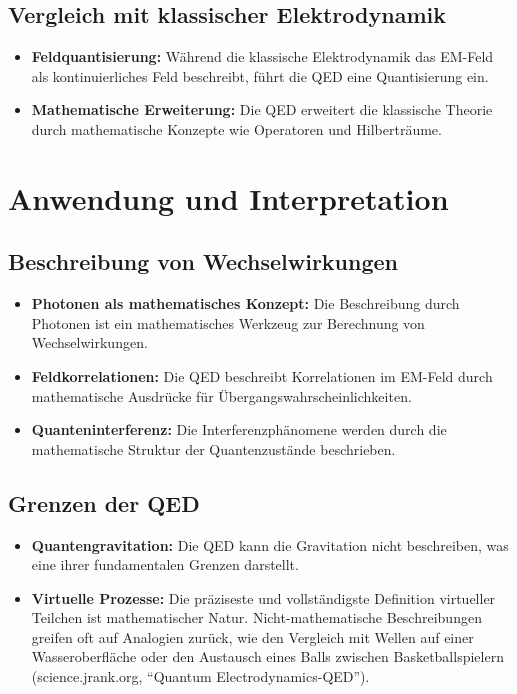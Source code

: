 \documentclass[12pt,a4paper]{article}
\begin{document}
\subsection{Vergleich mit klassischer Elektrodynamik}
\begin{itemize}
\item \textbf{Feldquantisierung:} Während die klassische Elektrodynamik das EM-Feld als kontinuierliches Feld beschreibt, führt die QED eine Quantisierung ein.
\item \textbf{Mathematische Erweiterung:} Die QED erweitert die klassische Theorie durch mathematische Konzepte wie Operatoren und Hilberträume.
\end{itemize}

\section{Anwendung und Interpretation}
\subsection{Beschreibung von Wechselwirkungen}
\begin{itemize}
\item \textbf{Photonen als mathematisches Konzept:} Die Beschreibung durch Photonen ist ein mathematisches Werkzeug zur Berechnung von Wechselwirkungen.
\item \textbf{Feldkorrelationen:} Die QED beschreibt Korrelationen im EM-Feld durch mathematische Ausdrücke für Übergangswahrscheinlichkeiten.
\item \textbf{Quanteninterferenz:} Die Interferenzphänomene werden durch die mathematische Struktur der Quantenzustände beschrieben.
\end{itemize}

\subsection{Grenzen der QED}
\begin{itemize}
\item \textbf{Quantengravitation:} Die QED kann die Gravitation nicht beschreiben, was eine ihrer fundamentalen Grenzen darstellt.
\item \textbf{Virtuelle Prozesse:} Die präziseste und vollständigste Definition virtueller Teilchen ist mathematischer Natur. Nicht-mathematische Beschreibungen greifen oft auf Analogien zurück, wie den Vergleich mit Wellen auf einer Wasseroberfläche oder den Austausch eines Balls zwischen Basketballspielern (science.jrank.org, ``Quantum Electrodynamics-QED'').
\end{itemize}
\end{document}

